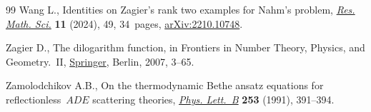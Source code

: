\documentclass[pdftex]{sigma}
\numberwithin{equation}{section}
\theoremstyle{definition}
\begin{document}
\begin{thebibliography}{99}
Wang L., Identities on {Z}agier's rank two examples for {N}ahm's problem,
 \href{https://doi.org/10.1007/s40687-024-00460-z}{\textit{Res. Math. Sci.}}
 \textbf{11} (2024), 49, 34~pages,
 \href{http://arxiv.org/abs/2210.10748}{arXiv:2210.10748}.

Zagier D., The dilogarithm function, in Frontiers in {N}umber {T}heory,
 {P}hysics, and {G}eometry.~{II},
 \href{https://doi.org/10.1007/978-3-540-30308-4_1}{Springer}, Berlin, 2007,
 3--65.

Zamolodchikov A.B., On the thermodynamic {B}ethe ansatz equations for
 reflectionless~{$ADE$} scattering theories,
 \href{https://doi.org/10.1016/0370-2693(91)91737-G}{\textit{Phys. Lett.~B}}
 \textbf{253} (1991), 391--394.

\end{thebibliography}\LastPageEnding
\end{document}
